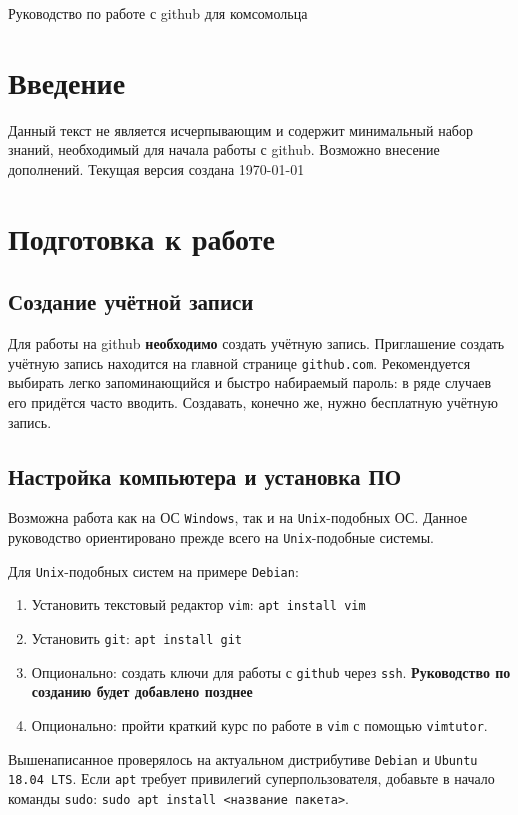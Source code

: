 \documentclass[oneside, final, 12pt]{article}
\begin{document}
\begin{center}
\Large{Руководство по работе с github для комсомольца}\\
\end{center}

\tableofcontents

\section*{Введение}
Данный текст не является исчерпывающим и содержит минимальный набор знаний, необходимый для начала работы с github. Возможно внесение дополнений.
Текущая версия создана \today
\section{Подготовка к работе}
\subsection{Создание учётной записи}
Для работы на github {\bf необходимо} создать учётную запись. Приглашение создать учётную запись находится на главной странице \texttt{github.com}. Рекомендуется выбирать легко запоминающийся и быстро набираемый пароль: в ряде случаев его придётся часто вводить. Создавать, конечно же, нужно бесплатную учётную запись.
\subsection{Настройка компьютера и установка ПО}
Возможна работа как на ОС \texttt{Windows}, так и на \texttt{Unix}-подобных ОС. Данное руководство ориентировано прежде всего на \texttt{Unix}-подобные системы.

Для \texttt{Unix}-подобных систем на примере \texttt{Debian}:
\begin{enumerate}
\item Установить текстовый редактор \texttt{vim}: \texttt{apt install vim}
\item Установить \texttt{git}: \texttt{apt install git}
\item Опционально: создать ключи для работы с \texttt{github} через \texttt{ssh}. {\bf Руководство по созданию будет добавлено позднее}
\item Опционально: пройти краткий курс по работе в \texttt{vim} с помощью \texttt{vimtutor}.
\end{enumerate}
Вышенаписанное проверялось на актуальном дистрибутиве \texttt{Debian} и \texttt{Ubuntu 18.04 LTS}. Если \texttt{apt} требует привилегий суперпользователя, добавьте в начало команды \texttt{sudo}: \texttt{sudo apt install <название пакета>}.
\end{document}
